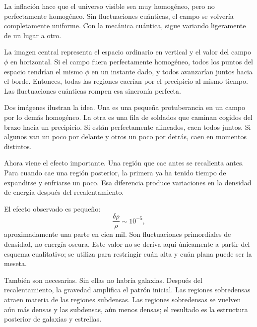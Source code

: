 La inflación hace que el universo visible sea muy homogéneo, pero no perfectamente homogéneo. Sin fluctuaciones cuánticas, el campo se volvería completamente uniforme. Con la mecánica cuántica, sigue variando ligeramente de un lugar a otro.

La imagen central representa el espacio ordinario en vertical y el valor del campo \(\phi\) en horizontal. Si el campo fuera perfectamente homogéneo, todos los puntos del espacio tendrían el mismo \(\phi\) en un instante dado, y todos avanzarían juntos hacia el borde. Entonces, todas las regiones caerían por el precipicio al mismo tiempo. Las fluctuaciones cuánticas rompen esa sincronía perfecta.

Dos imágenes ilustran la idea. Una es una pequeña protuberancia en un campo por lo demás homogéneo. La otra es una fila de soldados que caminan cogidos del brazo hacia un precipicio. Si están perfectamente alineados, caen todos juntos. Si algunos van un poco por delante y otros un poco por detrás, caen en momentos distintos.

Ahora viene el efecto importante. Una región que cae antes se recalienta antes. Para cuando cae una región posterior, la primera ya ha tenido tiempo de expandirse y enfriarse un poco. Esa diferencia produce variaciones en la densidad de energía después del recalentamiento.

\begin{classroomqa}
\end{classroomqa}

El efecto observado es pequeño:
\begin{equation}
\frac{\delta\rho}{\rho}\sim 10^{-5},
\end{equation}
aproximadamente una parte en cien mil. Son fluctuaciones primordiales de densidad, no energía oscura. Este valor no se deriva aquí únicamente a partir del esquema cualitativo; se utiliza para restringir cuán alta y cuán plana puede ser la meseta.

También son necesarias. Sin ellas no habría galaxias. Después del recalentamiento, la gravedad amplifica el patrón inicial. Las regiones sobredensas atraen materia de las regiones subdensas. Las regiones sobredensas se vuelven aún más densas y las subdensas, aún menos densas; el resultado es la estructura posterior de galaxias y estrellas.

